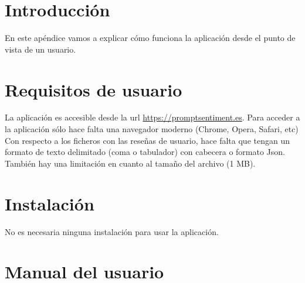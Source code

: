 
\section{Introducción}
En este apéndice vamos a explicar cómo funciona la aplicación desde el punto de vista de un usuario.

\section{Requisitos de usuario}
La aplicación es accesible desde la url \href{https://promptsentiment.es}{https://promptsentiment.es}.
Para acceder a la aplicación sólo hace falta una navegador moderno (Chrome, Opera, Safari, etc)
Con respecto a los ficheros con las reseñas de usuario, hace falta que tengan un formato 
de texto delimitado (coma o tabulador) con cabecera o formato Json.
También hay una limitación en cuanto al tamaño del archivo (1 MB).


\section{Instalación}
No es necesaria ninguna instalación para usar la aplicación.

\section{Manual del usuario}

